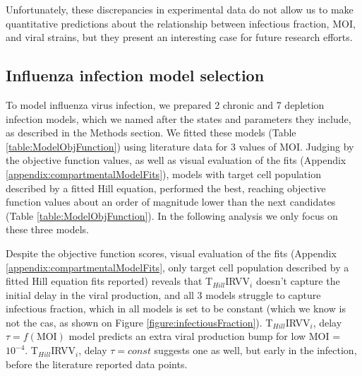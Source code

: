 Unfortunately, these discrepancies in experimental data do not allow us to make quantitative predictions about the relationship between infectious fraction, MOI, and viral strains, but they present an interesting case for future research efforts.

\subsection{Influenza infection model selection}

To model influenza virus infection, we prepared 2 chronic and 7 depletion infection models, which we named after the states and parameters they include, as described in the Methods section. We fitted these models (Table \ref{table:ModelObjFunction}) using literature data \cite{rudiger2019multiscale, frensing2016influenza} for 3 values of MOI. Judging by the objective function values, as well as visual evaluation of the fits (Appendix \ref{appendix:compartmentalModelFits}), models with target cell population described by a fitted Hill equation, performed the best, reaching objective function values about an order of magnitude lower than the next candidates (Table \ref{table:ModelObjFunction}). In the following analysis we only focus on these three models.

Despite the objective function scores, visual evaluation of the fits (Appendix \ref{appendix:compartmentalModelFits}, only target cell population described by a fitted Hill equation fits reported) reveals that T$_{Hill}$IRVV$_i$ doesn't capture the initial delay in the viral production, and all 3 models struggle to capture infectious fraction, which in all models is set to be constant (which we know is not the cas, as shown on Figure \ref{figure:infectiousFraction}). T$_{Hill}$IRVV$_i$, delay $\tau = f(\text{MOI})$ model predicts an extra viral production bump for low MOI = $10^{-4}$. T$_{Hill}$IRVV$_i$, delay $\tau = const$ suggests one as well, but early in the infection, before the literature reported data points.

